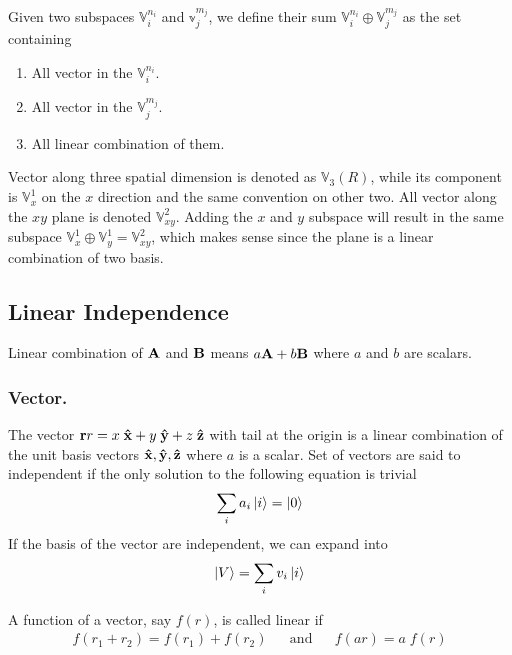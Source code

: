 \documentclass[../main.tex]{subfiles}
\begin{document}
Given two subspaces $\mathbb{V}_i^{n_i}$ and $\mathbb{v}_j^{m_j}$, we define their sum $\mathbb{V}_i^{n_i}\oplus\mathbb{V}_j^{m_j}$ as the set containing
\begin{enumerate}
	\item All vector in the $\mathbb{V}_i^{n_i}$.
	\item All vector in the $\mathbb{V}_j^{m_j}$.
	\item All linear combination of them.
\end{enumerate}

Vector along three spatial dimension is denoted as $\mathbb{V}_3(R)$, while its component is $\mathbb{V}_x^1$ on the $x$ direction and the same convention on other two.
All vector along the $xy$ plane is denoted $\mathbb{V}_{xy}^2$.
Adding the $x$ and $y$ subspace will result in the same subspace $\mathbb{V}_x^1\oplus \mathbb{V}_y^1=\mathbb{V}_{xy}^2$, which makes sense since the plane is a linear combination of two basis.

\subsection*{Linear Independence}
Linear combination of $\mathbf{A}$ and $\mathbf{B}$ means $a\mathbf{A} + b\mathbf{B}$ where $a$ and $b$ are scalars.

\subsubsection*{Vector.}
The vector $\mathbf{r}r = x\;\mathbf{\hat{x}}+y\;\mathbf{\hat{y}}+z\;\mathbf{\hat{z}}$ with tail at the origin is a linear combination of the unit basis vectors $\mathbf{\hat{x}},\mathbf{\hat{y}},\mathbf{\hat{z}}$
where $a$ is a scalar.
Set of vectors are said to independent if the only solution to the following equation is trivial
\begin{equation*}
	\sum_i a_i\ket{i}=\ket{0}
\end{equation*}
If the basis of the vector are independent, we can expand into
\begin{equation*}
	\ket{V}=\sum_i v_i \ket{i}
\end{equation*}

A function of a vector, say $f (r)$, is called linear if
\begin{align*}
	f(r_1+r_2)= f(r_1)+ f(r_2) &  & \mathrm{and} &  & f(ar)=a\;f(r)
\end{align*}
\end{document}
